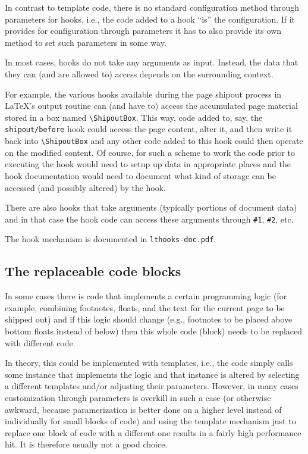 \documentclass{article}
\begin{document}
In contrast to template code, there is no standard configuration method
through parameters for hooks, i.e., the code added to a hook \enquote{is} the
configuration. If it provides for configuration through parameters it
has to also provide its own method to set such parameters in some way.

In most cases, hooks do not take any arguments as input. Instead, the data
that they can (and are allowed to) access depends on the surrounding
context.

For example, the various hooks available during the page shipout
process in \LaTeX's output routine can (and have to) access the
accumulated page material stored in a box named
\verb=\ShipoutBox=. This way, code added to, say, the
\texttt{shipout/before} hook could access the page content, alter it,
and then write it back into \verb=\ShipoutBox= and any other code
added to this hook could then operate on the modified content.  Of
course, for such a scheme to work the code prior to executing the hook
would need to setup up data in appropriate places and the hook
documentation would need to document what kind of storage can be
accessed (and possibly altered) by the hook.

There are also hooks that take arguments (typically portions of
document data) and in that case the hook code can access these
arguments through \verb=#1=, \verb=#2=, etc.

The hook mechanism is documented in \texttt{lthooks-doc.pdf}.

\subsection{The replaceable code blocks}

In some cases there is code that implements a certain programming
logic (for example, combining footnotes, floats, and the text for the
current page to be shipped out) and if this logic should change (e.g.,
footnotes to be placed above bottom floats instead of below) then this
whole code (block) needs to be replaced with different code.

In theory, this could be implemented with templates, i.e., the code
simply calls some instance that implements the logic and that instance
is altered by selecting a different templates and/or adjusting their
parameters. However, in many cases customization through parameters is
overkill in such a case (or otherwise awkward, because paramerization
is better done on a higher level instead of individually for small
blocks of code) and using the template mechanism just to replace one
block of code with a different one results in a fairly high
performance hit. It is therefore usually not a good choice.
\end{document}
